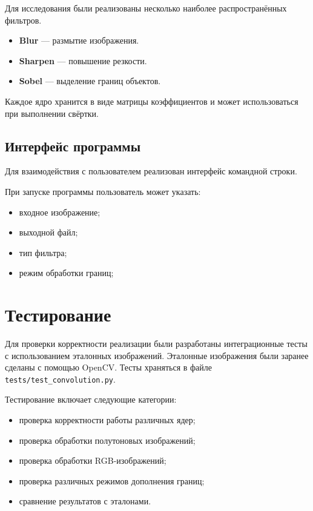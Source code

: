\documentclass[a4paper]{article}
\begin{document}
Для исследования были реализованы несколько наиболее распространённых фильтров.
\begin{itemize}
    \item \textbf{Blur} --- размытие изображения.
    \item \textbf{Sharpen} --- повышение резкости.
    \item \textbf{Sobel} --- выделение границ объектов.
\end{itemize}

Каждое ядро хранится в виде матрицы коэффициентов и может использоваться при выполнении свёртки.

\subsection{Интерфейс программы}

Для взаимодействия с пользователем реализован интерфейс командной строки.

При запуске программы пользователь может указать:
\begin{itemize}
    \item входное изображение;
    \item выходной файл;
    \item тип фильтра;
    \item режим обработки границ;
\end{itemize}

\section{Тестирование}

Для проверки корректности реализации были разработаны интеграционные тесты с использованием эталонных изображений. Эталонные изображения были заранее сделаны с помощью OpenCV. Тесты храняться в файле \verb|tests/test_convolution.py|.

Тестирование включает следующие категории:
\begin{itemize}
    \item проверка корректности работы различных ядер;
    \item проверка обработки полутоновых изображений;
    \item проверка обработки RGB-изображений;
    \item проверка различных режимов дополнения границ;
    \item сравнение результатов с эталонами.
\end{itemize}
\end{document}
